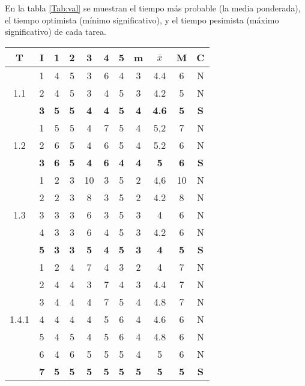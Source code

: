 \documentclass[11pt,a4paper,spanish,twoside]{report}
\begin{document}
En la tabla \ref{Tab:val} se muestran el tiempo más probable (la media
ponderada), el tiempo optimista (mínimo significativo), y el tiempo pesimista
(máximo significativo) de cada tarea.

\begin{table}[!h]
\centering
  \begin{tabular}{|c|c||c|c|c|c|c||c|c|c||c|}
    \hline
    \textbf{T} & \textbf{I} & \textbf{1} &
    \textbf{2} & \textbf{3} & \textbf{4} & \textbf{5} & \textbf{m}
    &\textbf{$\bar{x}$} &\textbf{M} & \textbf{C}\\
    \hline \hline
    \multirow{3}{*}{1.1} & 1 & 4 & 5 & 3 & 6 & 4 & 3 & 4.4 & 6 & N \\
    & 2 & 4 & 5 & 3 & 4 & 5 & 3 & 4.2 & 5 & N\\
    &\textbf{3} &\textbf {5} &\textbf {5} &\textbf {4} &\textbf {4} &\textbf{5} & \textbf{4} & \textbf{4.6} &\textbf{5} & \textbf{S}\\
    \hline

    \multirow{3}{*}{1.2} & 1 & 5 & 5 & 4 & 7 & 5 & 4 & 5,2 & 7 & N\\
    & 2 & 6 & 5 & 4 & 6 & 5 & 4 & 5.2 & 6 & N\\
    &\textbf{3} & \textbf{6} & \textbf{5} & \textbf{4} & \textbf{6} &
    \textbf{4} & \textbf{4} & \textbf{5} & \textbf{6} & \textbf{S} \\    
    \hline

    \multirow{5}{*}{1.3} & 1 & 2 & 3 & 10 & 3 & 5 & 2 & 4,6 & 10& N\\
    & 2 & 2 & 3 & 8 & 3 & 5 & 2 & 4.2 & 8 & N \\
    & 3 & 3 & 3 & 6 & 3 & 5 & 3 & 4 & 6 & N \\
    & 4 & 3 & 3 & 6 & 4 & 5 & 3 & 4.2 & 6 & N \\
    & \textbf{5} & \textbf{3} & \textbf{3} & \textbf{5} & \textbf{4} & \textbf{5} & \textbf{3} & \textbf{4} & \textbf{5} & \textbf{S} \\
    \hline

    \multirow{7}{*}{1.4.1} & 1 & 2 & 4 & 7 & 4 & 3 & 2 & 4 & 7 & N\\
    & 2 & 4 & 4 & 3 & 7 & 4 & 3 & 4.4 & 7 & N \\
    & 3 & 4 & 4 & 4 & 7 & 5 & 4 & 4.8 & 7 & N \\
    & 4 & 4 & 4 & 4 & 5 & 6 & 4 & 4.6 & 6 & N \\
    & 5 & 4 & 5 & 4 & 5 & 6 & 4 & 4.8 & 6 & N \\
    & 6 & 4 & 6 & 5 & 5 & 5 & 4 & 5 & 6 & N \\
    & \textbf{7} & \textbf{5} & \textbf{5} & \textbf{5} & \textbf{5} & \textbf{5} & \textbf{5} & \textbf{5} & \textbf{5} & \textbf{S} \\
    \hline


\end{tabular}
\end{table}
\end{document}
